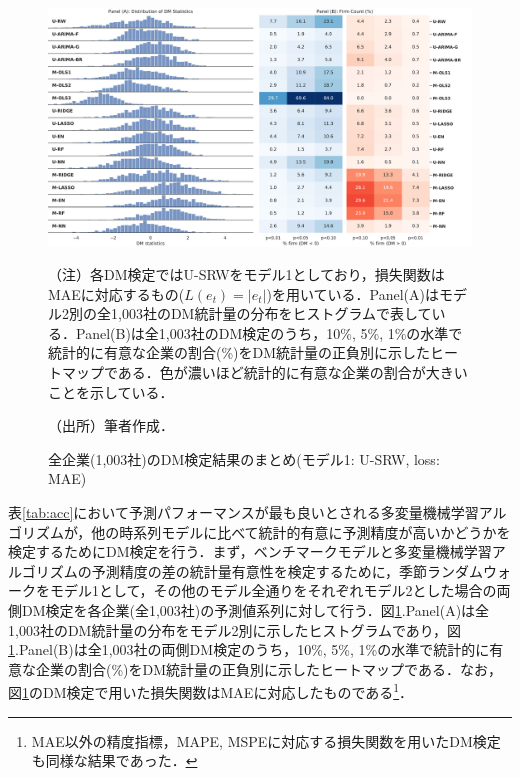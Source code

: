 \documentclass[a4paper，11pt]{jsarticle}
\begin{document}
\begin{figure}[tbp]
  \centering
  \caption{全企業(1,003社)のDM検定結果のまとめ(モデル1: U-SRW, loss: MAE)}
  \label{fig:dm_srw}
  \includegraphics[width=\linewidth]{./img/_dm_MAD_y_hat_srw.pdf}
  \begin{threeparttable}
  \begin{tablenotes}
    \item[]（注）各DM検定ではU-SRWをモデル1としており，損失関数はMAEに対応するもの($L(e_t)=|e_t|$)を用いている．Panel(A)はモデル2別の全1,003社のDM統計量の分布をヒストグラムで表している．Panel(B)は全1,003社のDM検定のうち，10\%, 5\%, 1\%の水準で統計的に有意な企業の割合(\%)をDM統計量の正負別に示したヒートマップである．色が濃いほど統計的に有意な企業の割合が大きいことを示している．
    \item[]（出所）筆者作成．
  \end{tablenotes}
  \end{threeparttable}
\end{figure}

表\ref{tab:acc}において予測パフォーマンスが最も良いとされる多変量機械学習アルゴリズムが，他の時系列モデルに比べて統計的有意に予測精度が高いかどうかを検定するためにDM検定を行う．まず，ベンチマークモデルと多変量機械学習アルゴリズムの予測精度の差の統計量有意性を検定するために，季節ランダムウォークをモデル1として，その他のモデル全通りをそれぞれモデル2とした場合の両側DM検定を各企業(全1,003社)の予測値系列に対して行う．図\ref{fig:dm_srw}.Panel(A)は全1,003社のDM統計量の分布をモデル2別に示したヒストグラムであり，図\ref{fig:dm_srw}.Panel(B)は全1,003社の両側DM検定のうち，10\%, 5\%, 1\%の水準で統計的に有意な企業の割合(\%)をDM統計量の正負別に示したヒートマップである．なお，図\ref{fig:dm_srw}のDM検定で用いた損失関数はMAEに対応したものである\footnote{MAE以外の精度指標，MAPE, MSPEに対応する損失関数を用いたDM検定も同様な結果であった．}．
\end{document}
